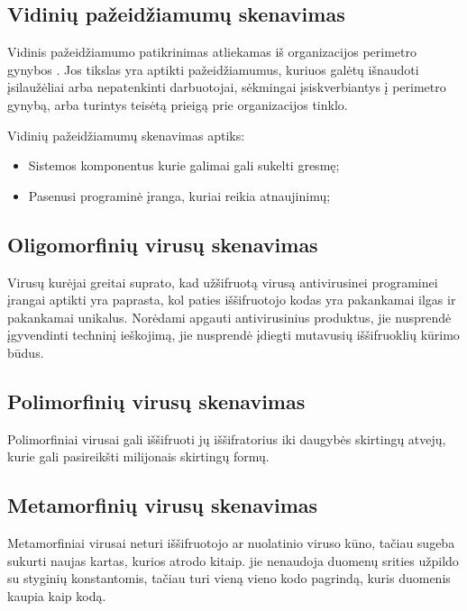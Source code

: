 \documentclass[a4paper,12pt,fleqn]{article}
\begin{document}
\subsection{Vidinių pažeidžiamumų skenavimas}
\label{sec:example}

Vidinis pažeidžiamumo patikrinimas atliekamas iš organizacijos perimetro gynybos \cite{asbjornslett1999assess}. Jos tikslas yra aptikti pažeidžiamumus, kuriuos galėtų išnaudoti įsilaužėliai arba nepatenkinti darbuotojai, sėkmingai įsiskverbiantys į perimetro gynybą, arba turintys teisėtą prieigą prie organizacijos tinklo.

Vidinių pažeidžiamumų skenavimas aptiks:
\begin{itemize}
	\item Sistemos komponentus kurie galimai gali sukelti gresmę;
	\item Pasenusi programinė įranga, kuriai reikia atnaujinimų;
\end{itemize}



\subsection{Oligomorfinių virusų skenavimas}
\label{sec:example}

Virusų kurėjai greitai suprato, kad užšifruotą virusą antivirusinei programinei įrangai aptikti yra paprasta, kol paties iššifruotojo kodas yra pakankamai ilgas ir pakankamai unikalus. Norėdami apgauti antivirusinius produktus, jie nusprendė įgyvendinti techninį ieškojimą, jie nusprendė įdiegti mutavusių iššifruoklių kūrimo būdus\cite{Szor:2005:ACV:1050957}. 

\subsection{Polimorfinių virusų skenavimas}
\label{sec:example}

Polimorfiniai virusai gali iššifruoti jų iššifratorius iki daugybės skirtingų atvejų, kurie gali pasireikšti milijonais skirtingų formų\cite{Szor:2005:ACV:1050957}. 

\subsection{Metamorfinių virusų skenavimas}
\label{sec:example}

Metamorfiniai virusai neturi iššifruotojo ar nuolatinio viruso kūno, tačiau sugeba sukurti naujas kartas, kurios atrodo kitaip. jie nenaudoja duomenų srities užpildo su styginių konstantomis, tačiau turi vieną vieno kodo pagrindą, kuris duomenis kaupia kaip kodą\cite{Szor:2005:ACV:1050957}. 
\end{document}

